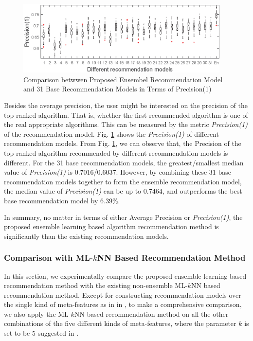 \documentclass[acmsmall]{acmart}
\begin{document}
\begin{figure}[!h]
	\centering
	\includegraphics[width=0.95\textwidth]{Figures/FirstPrecisionComparison}
	\caption{Comparison betwwen Proposed Ensembel Recommendation Model and 31 Base Recommendation Models in Terms of Precision(1)}\label{Fig:CompOnPrecision1}
\end{figure}

Besides the average precision, the user might be interested on the
precision of the top ranked algorithm. That is, whether the first
recommended algorithm is one of the real appropriate algorithms.
This can be measured by the metric \emph{Precision(1)} of the
recommendation model. Fig. \ref{Fig:CompOnPrecision1} shows the
\emph{Precision(1)} of different recommendation models. From Fig.
\ref{Fig:CompOnPrecision1}, we can observe that, the Precision of
the top ranked algorithm recommended by different recommendation
models is different. For the 31 base recommendation models, the
greatest/smallest median value of \emph{Precision(1)} is
0.7016/0.6037. However, by combining these 31 base recommendation
models together to form the ensemble recommendation model, the
median value of \emph{Precision(1)} can be up to 0.7464, and
outperforms the best base recommendation model by 6.39\%.

In summary, no matter in terms of either Average Precision or
\emph{Precision(1)}, the proposed ensemble learning based algorithm
recommendation method is significantly than the existing
recommendation models.

\subsubsection{Comparison with ML-$k$NN Based Recommendation Method}

In this section, we experimentally compare the proposed ensemble
learning based recommendation method with the existing non-ensemble
ML-$k$NN based recommendation
method. Except for constructing recommendation models over the single kind of meta-features as in  in \cite{wang2014generic}, to make a comprehensive
comparison, we also apply the ML-$k$NN based recommendation method
on all the other combinations of the five different kinds of meta-features, where the parameter $k$ is set to be 5 suggested
in \cite{wang2014generic}.
\end{document}

